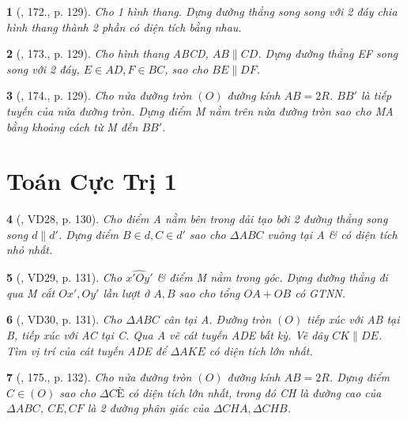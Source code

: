 \documentclass{article}
\newtheorem{baitoan}{}
\begin{document}
\begin{baitoan}[\cite{Binh_Toan_9_tap_1}, 172., p. 129]
	Cho 1 hình thang. Dựng đường thẳng song song với 2 đáy chia hình thang thành 2 phần có diện tích bằng nhau.
\end{baitoan}

\begin{baitoan}[\cite{Binh_Toan_9_tap_1}, 173., p. 129]
	Cho hình thang ABCD, $AB\parallel CD$. Dựng đường thẳng EF song song với 2 đáy, $E\in AD,F\in BC$, sao cho $BE\parallel DF$.
\end{baitoan}

\begin{baitoan}[\cite{Binh_Toan_9_tap_1}, 174., p. 129]
	Cho nửa đường tròn $(O)$ đường kính $AB = 2R$. $BB'$ là tiếp tuyến của nửa đường tròn. Dựng điểm M nằm trên nửa đường tròn sao cho MA bằng khoảng cách từ M đến $BB'$.
\end{baitoan}


\section{Toán Cực Trị 1}

\begin{baitoan}[\cite{Binh_Toan_9_tap_1}, VD28, p. 130]
	Cho điểm A nằm bên trong dải tạo bởi 2 đường thẳng song song $d\parallel d'$. Dựng điểm $B\in d,C\in d'$ sao cho $\Delta ABC$ vuông tại A \& có diện tích nhỏ nhất.
\end{baitoan}

\begin{baitoan}[\cite{Binh_Toan_9_tap_1}, VD29, p. 131]
	Cho $\widehat{x'Oy'}$ \& điểm M nằm trong góc. Dựng đường thẳng đi qua M cắt $Ox',Oy'$ lần lượt ở $A,B$ sao cho tổng $OA + OB$ có {\rm GTNN}.
\end{baitoan}

\begin{baitoan}[\cite{Binh_Toan_9_tap_1}, VD30, p. 131]
	Cho $\Delta ABC$ cân tại A. Đường tròn $(O)$ tiếp xúc với AB tại B, tiếp xúc với AC tại C. Qua A vẽ cát tuyến ADE bất kỳ. Vẽ dây $CK\parallel DE$. Tìm vị trí của cát tuyến ADE để $\Delta AKE$ có diện tích lớn nhất.
\end{baitoan}

\begin{baitoan}[\cite{Binh_Toan_9_tap_1}, 175., p. 132]
	Cho nửa đường tròn $(O)$ đường kính $AB = 2R$. Dựng điểm $C\in(O)$ sao cho $\Delta CÈ$ có diện tích lớn nhất, trong đó CH là đường cao của $\Delta ABC$, $CE,CF$ là 2 đường phân giác của $\Delta CHA,\Delta CHB$.
\end{baitoan}
\end{document}
